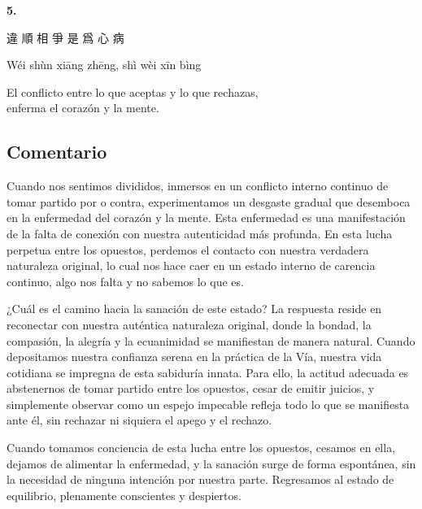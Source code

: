 \documentclass[
  a5paperpaper,
]{article}
\begin{document}
\hfill\break

\hypertarget{05}{}
\begin{verseblock}

\newpage

\begin{center}\textbf{5.}\end{center}

違 順 相 爭 是 爲 心 病

Wéi shùn xiāng zhēng, shì wèi xīn bìng

El conflicto entre lo que aceptas y lo que rechazas,\\
enferma el corazón y la mente.

\end{verseblock}

\hfill\break

\hypertarget{comentario-4}{%
\subsection{Comentario}\label{comentario-4}}

Cuando nos sentimos divididos, inmersos en un conflicto interno continuo
de tomar partido por o contra, experimentamos un desgaste gradual que
desemboca en la enfermedad del corazón y la mente. Esta enfermedad es
una manifestación de la falta de conexión con nuestra autenticidad más
profunda. En esta lucha perpetua entre los opuestos, perdemos el
contacto con nuestra verdadera naturaleza original, lo cual nos hace
caer en un estado interno de carencia continuo, algo nos falta y no
sabemos lo que es.

¿Cuál es el camino hacia la sanación de este estado? La respuesta reside
en reconectar con nuestra auténtica naturaleza original, donde la
bondad, la compasión, la alegría y la ecuanimidad se manifiestan de
manera natural. Cuando depositamos nuestra confianza serena en la
práctica de la Vía, nuestra vida cotidiana se impregna de esta sabiduría
innata. Para ello, la actitud adecuada es abstenernos de tomar partido
entre los opuestos, cesar de emitir juicios, y simplemente observar como
un espejo impecable refleja todo lo que se manifiesta ante él, sin
rechazar ni siquiera el apego y el rechazo.

Cuando tomamos conciencia de esta lucha entre los opuestos, cesamos en
ella, dejamos de alimentar la enfermedad, y la sanación surge de forma
espontánea, sin la necesidad de ninguna intención por nuestra parte.
Regresamos al estado de equilibrio, plenamente conscientes y despiertos.
\end{document}
